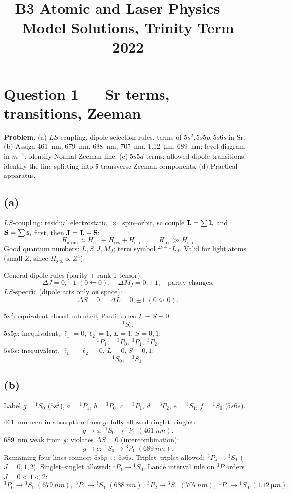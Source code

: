 \documentclass[11pt]{article}
\title{B3 Atomic and Laser Physics --- Model Solutions, Trinity Term 2022}
\author{}
\date{}
\begin{document}
\maketitle

\section*{Question 1 --- Sr terms, transitions, Zeeman}

\textbf{Problem.} (a) $LS$-coupling, dipole selection rules, terms of $5s^2,5s5p,5s6s$ in Sr. (b) Assign \SI{461}{nm}, \SI{679}{nm}, \SI{688}{nm}, \SI{707}{nm}, \SI{1.12}{\micro m}, \SI{689}{nm}; level diagram in $\si{m^{-1}}$; identify Normal Zeeman line. (c) $5s5d$ terms; allowed dipole transitions; identify the line splitting into 6 transverse-Zeeman components. (d) Practical apparatus.

\subsection*{(a)}

$LS$-coupling: residual electrostatic $\gg$ spin--orbit, so couple $\vb L=\sum\vb l_i$ and $\vb S=\sum\vb s_i$ first, then $\vb J=\vb L+\vb S$:
\[ H_\text{atom}\approx H_\text{c.f.}+H_\text{res}+H_\text{s.o.},\qquad H_\text{res}\gg H_\text{s.o.} \]
Good quantum numbers: $L,S,J,M_J$; term symbol ${}^{2S+1}L_J$. Valid for light atoms (small $Z$, since $H_\text{s.o.}\propto Z^4$).

General dipole rules (parity + rank-1 tensor):
\[ \Delta J=0,\pm1\;(0\nleftrightarrow 0),\quad \Delta M_J=0,\pm1,\quad \text{parity changes}. \]
$LS$-specific (dipole acts only on space):
\[ \Delta S=0,\quad \Delta L=0,\pm1\;(0\nleftrightarrow 0). \]

$5s^2$: equivalent closed sub-shell, Pauli forces $L=S=0$:
\[ {}^1S_0. \]
$5s5p$: inequivalent, $\ell_1=0,\ell_2=1$, $L=1$, $S=0,1$:
\[ {}^1P_1,\quad {}^3P_0,\;{}^3P_1,\;{}^3P_2. \]
$5s6s$: inequivalent, $\ell_1=\ell_2=0$, $L=0$, $S=0,1$:
\[ {}^1S_0,\quad {}^3S_1. \]

\subsection*{(b)}

Label $g={}^1S_0$ ($5s^2$), $a={}^1P_1$, $b={}^3P_0$, $c={}^3P_1$, $d={}^3P_2$, $e={}^3S_1$, $f={}^1S_0$ ($5s6s$).

\SI{461}{nm} seen in absorption from $g$: fully allowed singlet--singlet:
\[ g\to a:\;{}^1S_0\to{}^1P_1\;(\SI{461}{nm}). \]
\SI{689}{nm} weak from $g$: violates $\Delta S=0$ (intercombination):
\[ g\to c:\;{}^1S_0\to{}^3P_1\;(\SI{689}{nm}). \]
Remaining four lines connect $5s5p\leftrightarrow 5s6s$. Triplet--triplet allowed: ${}^3P_J\to{}^3S_1$ ($J=0,1,2$). Singlet--singlet allowed: ${}^1P_1\to{}^1S_0$. Land\'e interval rule on ${}^3P$ orders $J=0<1<2$:
\[ {}^3P_0\to{}^3S_1\;(\SI{679}{nm}),\;{}^3P_1\to{}^3S_1\;(\SI{688}{nm}),\;{}^3P_2\to{}^3S_1\;(\SI{707}{nm}),\;{}^1P_1\to{}^1S_0\;(\SI{1.12}{\micro m}). \]
\end{document}
